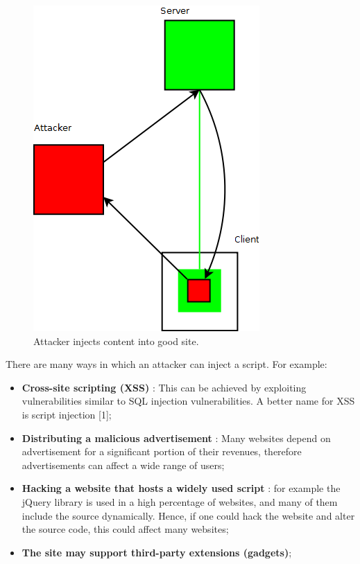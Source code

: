 \begin{figure}
	\begin{center}		
		\includegraphics[width=0.6\columnwidth]{img/security/threat-scenario-bad-server-injects-content}
		\caption{Attacker injects content into good site.}
		\label{fig:threat-scenario:bad-server-injects-content}
	\end{center}
\end{figure}


There are many ways in which an attacker can inject a script. For example:
\begin{itemize}
	\item \textbf{Cross-site scripting (XSS)} : This can be achieved by exploiting vulnerabilities similar to SQL injection vulnerabilities. A better name for XSS is script injection [1];
	\item \textbf{Distributing a malicious advertisement} : Many websites depend on advertisement for a significant portion of their revenues, therefore advertisements can affect a wide range of users;
	\item \textbf{Hacking a website that hosts a widely used script} : for example the jQuery library is used in a high percentage of websites, and many of them include the source dynamically. Hence, if one could hack the website and alter the source code, this could affect many websites;
	\item \textbf{The site may support third-party extensions (gadgets)};
\end{itemize}

